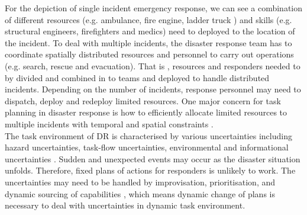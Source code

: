 For the depiction of single incident emergency response, we can see a combination of different resources (e.g. ambulance, fire engine, ladder truck ) and skills (e.g. structural engineers, firefighters and medics) need to deployed to the location of the incident. To deal with multiple incidents, the disaster response team has to coordinate spatially distributed resources and personnel to carry out operations (e.g. search, rescue and evacuation)\cite{Chen2005}. That is , resources and responders needed to by divided and combined in to teams and deployed to handle distributed incidents. Depending on the number of incidents, response personnel may need to dispatch, deploy and redeploy limited resources. One major concern for task planning in disaster response is how to efficiently allocate limited resources to multiple incidents with temporal and spatial constraints \cite{Bradshaw2011}.\\

The task environment of DR is characterised by various uncertainties including hazard uncertainties, task-flow uncertainties, environmental and informational uncertainties \cite{Chen2008}. Sudden and unexpected events may occur as the disaster situation unfolds. Therefore, fixed plans of actions for responders is unlikely to work. The uncertainties may need to be handled by improvisation, prioritisation, and dynamic sourcing of capabilities \cite{Faraj2006}, which means dynamic change of plans is necessary to deal with uncertainties in dynamic task environment.\\    






